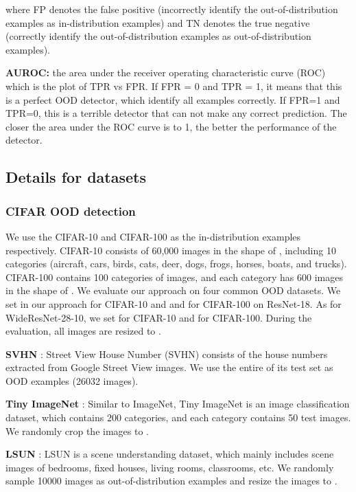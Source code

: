 \documentclass{article}
\begin{document}
where FP denotes the false positive (incorrectly identify the out-of-distribution examples as in-distribution examples) and TN denotes the true negative (correctly identify the out-of-distribution examples as out-of-distribution examples).

\textbf{AUROC:} the area under the receiver operating characteristic curve (ROC) which is the plot of
TPR vs FPR. If FPR = 0 and TPR = 1, it means that this is a perfect OOD detector, which identify all examples correctly. If FPR=1 and TPR=0, this is a terrible detector that can not make any correct prediction. The closer the area under the ROC curve is to 1, the better the performance of the detector.

\subsection{Details for datasets}

\subsubsection{CIFAR OOD detection}

We use the CIFAR-10 and CIFAR-100 \cite{krizhevsky2009learningCIFAR} as the in-distribution examples respectively. CIFAR-10 consists of 60,000 images in the shape of , including 10 categories (aircraft, cars, birds, cats, deer, dogs, frogs, horses, boats, and trucks). CIFAR-100 contains 100 categories of images, and each category has 600 images in the shape of . We evaluate our approach on four common OOD datasets. We set  in our approach for CIFAR-10 and  and for CIFAR-100 on ResNet-18. As for WideResNet-28-10, we set  for CIFAR-10 and  for CIFAR-100. During the evaluation, all images are resized to .

\textbf{SVHN} \cite{netzer2011readingSVHN}: Street View House Number (SVHN) consists of the house numbers extracted from Google Street View images. We use the entire of its test set as OOD examples (26032 images).



\textbf{Tiny ImageNet} \cite{chrabaszcz2017downsampledTiny}: Similar to ImageNet, Tiny ImageNet is an image classification dataset, which contains 200 categories, and each category contains 50 test images. We randomly crop the images to .

\textbf{LSUN} \cite{yu2015lsun}: LSUN is a scene understanding dataset, which mainly includes scene images of bedrooms, fixed houses, living rooms, classrooms, etc. We randomly sample 10000 images as out-of-distribution examples and resize the images to .
\end{document}
